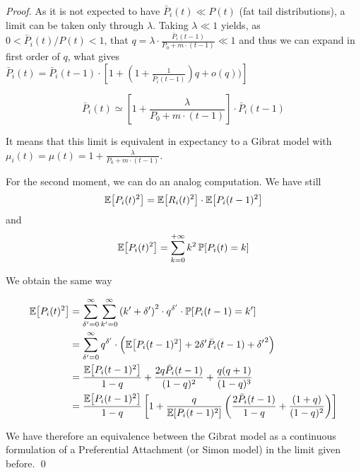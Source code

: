 \begin{proof}
As it is not expected to have $\bar{P}_i(t)\ll P(t)$ (fat tail distributions), a limit can be taken only through $\lambda$. Taking $\lambda \ll 1$ yields, as $0 < \bar{P}_i(t)/P(t) < 1$, that $q=\lambda\cdot\frac{\bar{P}_i(t-1)}{P_0 + m\cdot (t-1)} \ll 1$ and thus we can expand in first order of $q$, what gives $\bar{P}_i(t)=\bar{P}_i(t-1)\cdot \left[1 + \left(1+\frac{1}{\bar{P}_i(t-1)}\right)q + o(q))\right]$

\[
\bar{P}_i(t) \simeq \left[1 + \frac{\lambda}{P_0 + m\cdot (t-1)}\right]\cdot \bar{P}_i(t-1)
\]

It means that this limit is equivalent in expectancy to a Gibrat model with $\mu_i(t) = \mu(t)=1 + \frac{\lambda}{P_0 + m\cdot (t-1)}$.

For the second moment, we can do an analog computation. We have still \[\operatorname{\mathbb{E}}\!\left[P_i(t)^2\right] = \operatorname{\mathbb{E}}\!\left[R_i(t)^2\right]\cdot \operatorname{\mathbb{E}}\!\left[P_i(t-1)^2\right]\]
and
\[\operatorname{\mathbb{E}}\!\left[P_i(t)^2\right]=\sum_{k=0}^{+\infty}{k^2 \operatorname{\mathbb{P}}\!\left[P_i(t)=k\right]}\] 

We obtain the same way 

\[
\begin{split}
\operatorname{\mathbb{E}}\!\left[P_i(t)^2\right] & = \sum_{\delta^{\prime}=0}^{\infty}{\sum_{k^{\prime}=0}^{\infty}{\left(k^\prime + \delta^{\prime}\right)^2\cdot q^{\delta^{\prime}} \cdot \operatorname{\mathbb{P}}\!\left[P_i(t-1)=k^\prime\right]}}\\ 
& = \sum_{\delta^{\prime}=0}^{\infty}{q^{\delta^{\prime}}\cdot \left(\operatorname{\mathbb{E}}\!\left[P_i(t-1)^2\right]+2\delta^{\prime}\bar{P}_i(t-1) + {\delta^{\prime}}^2\right)}\\
& = \frac{\operatorname{\mathbb{E}}\!\left[P_i(t-1)^2\right]}{1-q} + \frac{2 q \bar{P}_i(t-1)}{(1-q)^2} + \frac{q(q+1)}{(1-q)^3}\\
& = \frac{\operatorname{\mathbb{E}}\!\left[P_i(t-1)^2\right]}{1-q}\left[1 + \frac{q}{\operatorname{\mathbb{E}}\!\left[P_i(t-1)^2\right]}\left(\frac{2\bar{P}_i(t-1)}{1-q} + \frac{(1+q)}{(1-q)^2}\right)\right]
\end{split}
\]



We have therefore an equivalence between the Gibrat model as a continuous formulation of a Preferential Attachment (or Simon model) in the limit given before. \qed

\end{proof}








\newpage




